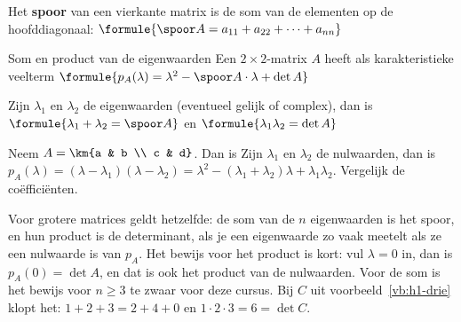 \begin{theorie}
Het \textbf{\textcolor{accent}{spoor}} van een vierkante matrix is de som van de elementen op de hoofddiagonaal: \quad $\formule{\spoor A = a_{11} + a_{22} + \cdots + a_{nn}}$

\begin{stelling}{Som en product van de eigenwaarden}
Een $2 \times 2$-matrix $A$ heeft als karakteristieke veelterm \quad $\formule{p_A(\lambda) = \lambda^2 - \spoor A \cdot \lambda + \det A}$

\vspace{1mm}
Zijn $\lambda_1$ en $\lambda_2$ de eigenwaarden (eventueel gelijk of complex), dan is \quad $\formule{\lambda_1 + \lambda_2 = \spoor A}$ \quad en \quad $\formule{\lambda_1\lambda_2 = \det A}$
\end{stelling}

\begin{bewijs}
Neem $A = \km{a & b \\ c & d}$. Dan is
Zijn $\lambda_1$ en $\lambda_2$ de nulwaarden, dan is $p_A(\lambda) = (\lambda - \lambda_1)(\lambda - \lambda_2) = \lambda^2 - (\lambda_1 + \lambda_2)\lambda + \lambda_1\lambda_2$. Vergelijk de coëfficiënten.
\end{bewijs}
\end{theorie}

Voor grotere matrices geldt hetzelfde: de som van de $n$ eigenwaarden is het spoor, en hun product is de determinant, als je een eigenwaarde zo vaak meetelt als ze een nulwaarde is van $p_A$. Het bewijs voor het product is kort: vul $\lambda = 0$ in, dan is $p_A(0) = \det A$, en dat is ook het product van de nulwaarden. Voor de som is het bewijs voor $n \geqslant 3$ te zwaar voor deze cursus. Bij $C$ uit voorbeeld~\ref{vb:h1-drie} klopt het: $1 + 2 + 3 = 2 + 4 + 0$ en $1 \cdot 2 \cdot 3 = 6 = \det C$.


